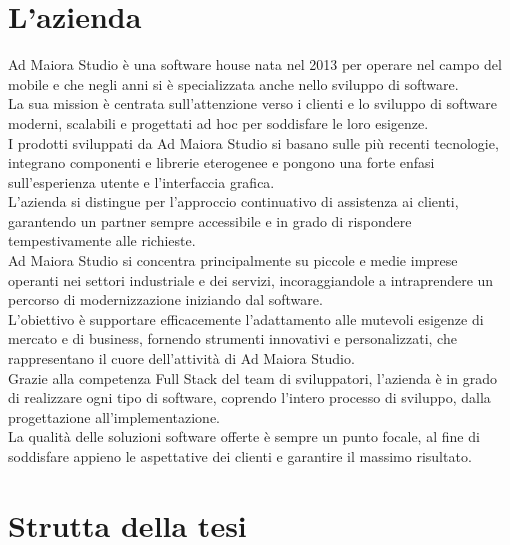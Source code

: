\clearpage
\section{L'azienda}

Ad Maiora Studio è una software house nata nel 2013 per operare nel campo del mobile e che negli anni si è specializzata anche nello sviluppo di software.\\
La sua mission è centrata sull'attenzione verso i clienti e lo sviluppo di software moderni, scalabili e progettati ad hoc per soddisfare le loro esigenze. \\
I prodotti sviluppati da Ad Maiora Studio si basano sulle più recenti tecnologie, integrano componenti e librerie eterogenee e pongono una forte enfasi sull'esperienza utente
 e l'interfaccia grafica.\\
L'azienda si distingue per l'approccio continuativo di assistenza ai clienti, 
garantendo un partner sempre accessibile e in grado di rispondere tempestivamente alle richieste. \\
Ad Maiora Studio si concentra principalmente su piccole e medie imprese operanti nei settori industriale e dei servizi, incoraggiandole a intraprendere un percorso di modernizzazione
 iniziando dal software.\\
  L'obiettivo è supportare efficacemente l'adattamento alle mutevoli esigenze di mercato e di business, fornendo strumenti innovativi e personalizzati, 
  che rappresentano il cuore dell'attività di Ad Maiora Studio.\\
Grazie alla competenza Full Stack del team di sviluppatori, l'azienda è in grado di realizzare ogni tipo di software, 
coprendo l'intero processo di sviluppo, dalla progettazione all'implementazione.\\
La qualità delle soluzioni software offerte è sempre un punto focale, al fine di soddisfare appieno le aspettative dei clienti e garantire il massimo risultato.

\section{Strutta della tesi}

